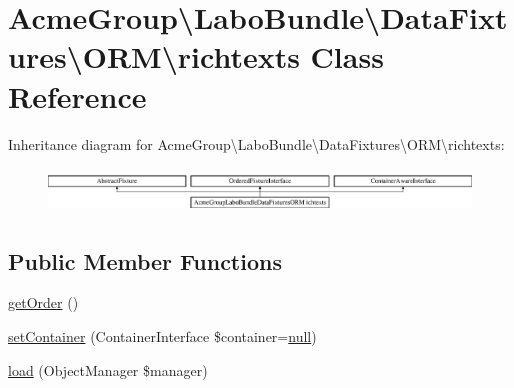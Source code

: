 \hypertarget{class_acme_group_1_1_labo_bundle_1_1_data_fixtures_1_1_o_r_m_1_1richtexts}{\section{Acme\+Group\textbackslash{}Labo\+Bundle\textbackslash{}Data\+Fixtures\textbackslash{}O\+R\+M\textbackslash{}richtexts Class Reference}
\label{class_acme_group_1_1_labo_bundle_1_1_data_fixtures_1_1_o_r_m_1_1richtexts}
}
Inheritance diagram for Acme\+Group\textbackslash{}Labo\+Bundle\textbackslash{}Data\+Fixtures\textbackslash{}O\+R\+M\textbackslash{}richtexts\+:\begin{figure}[H]
\begin{center}
\leavevmode
\includegraphics[height=1.177708cm]{class_acme_group_1_1_labo_bundle_1_1_data_fixtures_1_1_o_r_m_1_1richtexts}
\end{center}
\end{figure}
\subsection*{Public Member Functions}
\begin{DoxyCompactItemize}
\item 
\hyperlink{class_acme_group_1_1_labo_bundle_1_1_data_fixtures_1_1_o_r_m_1_1richtexts_a82950743cccaba5c4c8177fcc54780f3}{get\+Order} ()
\item 
\hyperlink{class_acme_group_1_1_labo_bundle_1_1_data_fixtures_1_1_o_r_m_1_1richtexts_a48ba63f07269b85744318bdcec0aa43a}{set\+Container} (Container\+Interface \$container=\hyperlink{validate_8js_afb8e110345c45e74478894341ab6b28e}{null})
\item 
\hyperlink{class_acme_group_1_1_labo_bundle_1_1_data_fixtures_1_1_o_r_m_1_1richtexts_afb4eb16ca193001c11b43755718d4afa}{load} (Object\+Manager \$manager)
\end{DoxyCompactItemize}


